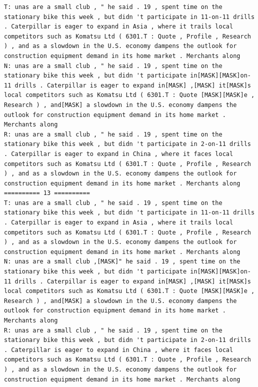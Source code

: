 
\begin{lstlisting}
T: unas are a small club , " he said . 19 , spent time on the stationary bike this week , but didn 't participate in 11-on-11 drills . Caterpillar is eager to expand in Asia , where it trails local competitors such as Komatsu Ltd ( 6301.T : Quote , Profile , Research ) , and as a slowdown in the U.S. economy dampens the outlook for construction equipment demand in its home market . Merchants along
N: unas are a small club , " he said . 19 , spent time on the stationary bike this week , but didn 't participate in[MASK][MASK]on-11 drills . Caterpillar is eager to expand in[MASK] ,[MASK] it[MASK]s local competitors such as Komatsu Ltd ( 6301.T : Quote [MASK][MASK]e , Research ) , and[MASK] a slowdown in the U.S. economy dampens the outlook for construction equipment demand in its home market . Merchants along
R: unas are a small club , " he said . 19 , spent time on the stationary bike this week , but didn 't participate in 2-on-11 drills . Caterpillar is eager to expand in China , where it faces local competitors such as Komatsu Ltd ( 6301.T : Quote , Profile , Research ) , and as a slowdown in the U.S. economy dampens the outlook for construction equipment demand in its home market . Merchants along
========== 13 ==========
T: unas are a small club , " he said . 19 , spent time on the stationary bike this week , but didn 't participate in 11-on-11 drills . Caterpillar is eager to expand in Asia , where it trails local competitors such as Komatsu Ltd ( 6301.T : Quote , Profile , Research ) , and as a slowdown in the U.S. economy dampens the outlook for construction equipment demand in its home market . Merchants along
N: unas are a small club ,[MASK]" he said . 19 , spent time on the stationary bike this week , but didn 't participate in[MASK][MASK]on-11 drills . Caterpillar is eager to expand in[MASK] ,[MASK] it[MASK]s local competitors such as Komatsu Ltd ( 6301.T : Quote [MASK][MASK]e , Research ) , and[MASK] a slowdown in the U.S. economy dampens the outlook for construction equipment demand in its home market . Merchants along
R: unas are a small club , " he said . 19 , spent time on the stationary bike this week , but didn 't participate in 2-on-11 drills . Caterpillar is eager to expand in China , where it faces local competitors such as Komatsu Ltd ( 6301.T : Quote , Profile , Research ) , and as a slowdown in the U.S. economy dampens the outlook for construction equipment demand in its home market . Merchants along
\end{lstlisting}


